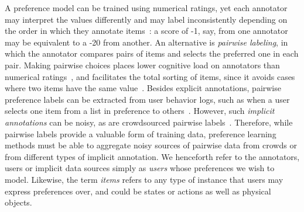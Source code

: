 A preference model can be trained using numerical ratings, yet 
each annotator may interpret the values differently and may label inconsistently depending on the order in which they annotate items~\citep{ovadia2004ratings,yannakakis2011ranking}: 
a score of -1, say, from one annotator may be equivalent to a -20 from another. 
An alternative is \emph{pairwise labeling}, 
in which the annotator compares pairs of items and selects the preferred one in each pair.
Making pairwise choices places lower cognitive load on annotators than numerical ratings~\citep{yang2011ranking},
and facilitates the total sorting of items, since it avoids cases where two items have the same value~\citep{kendall1948rank,kingsley2010preference}.
Besides explicit annotations, pairwise preference labels can be extracted from
user behavior logs, such as when a user selects one item from a list in preference
to others~\citep{joachims2002optimizing}. 
However, such \emph{implicit annotations} can be noisy, as are crowdsourced pairwise labels~\citep{habernal2016argument}.
Therefore, while pairwise labels provide a valuable
form of training data, preference learning methods must be able to 
aggregate noisy sources of pairwise data from crowds 
or from different types of implicit annotation.
We henceforth refer to the annotators, users or implicit data sources simply as \emph{users}
whose preferences we wish to model.
Likewise, the term \emph{items} refers to any type of instance that users may express preferences over,
and could be states or actions as well as physical objects.

